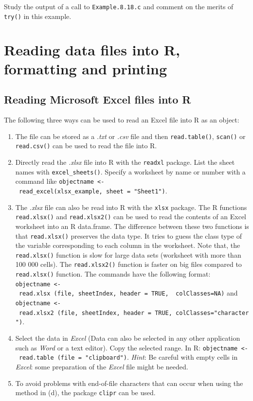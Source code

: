 \documentclass[
]{book}
\begin{document}
Study the output of a call to \texttt{Example.8.18.c} and comment on the merits of \texttt{try()} in this example.

\chapter{Reading data files into R, formatting and printing}\label{data}

\section{Reading Microsoft Excel files into R}\label{reading-microsoft-excel-files-into-r}

The following three ways can be used to read an Excel file into R as an object:

\begin{enumerate}
\def\labelenumi{(\alph{enumi})}
\item
  The file can be stored as a \emph{{.txt}} or \emph{{.csv}} file and then \texttt{read.table()}, \texttt{scan()} or \texttt{read.csv()} can be used to read the file into R.
\item
  Directly read the \emph{{.xlsx}} file into R with the \texttt{readxl} package. List the sheet names with \texttt{excel\_sheets()}. Specify a worksheet by name or number with a command like \texttt{objectname\ \textless{}-\ read\_excel(xlsx\_example,\ sheet\ =\ "Sheet1")}.
\item
  The \emph{{.xlsx}} file can also be read into R with the \texttt{xlsx} package. The R functions \texttt{read.xlsx()} and \texttt{read.xlsx2()} can be used to read the contents of an Excel worksheet into an R data.frame. The difference between these two functions is that \texttt{read.xlsx()} preserves the data type. It tries to guess the class type of the variable corresponding to each column in the worksheet. Note that, the \texttt{read.xlsx()} function is slow for large data sets (worksheet with more than 100 000 cells). The \texttt{read.xlsx2()} function is faster on big files compared to \texttt{read.xlsx()} function. The commands have the following format: \texttt{objectname\ \textless{}-\ read.xlsx\ (file,\ sheetIndex,\ header\ =\ TRUE,\ \ colClasses=NA)} and \texttt{objectname\ \textless{}-\ read.xlsx2\ (file,\ sheetIndex,\ header\ =\ TRUE,\ colClasses="character")}.
\item
  Select the data in \emph{{Excel}} (Data can also be selected in any other application such as \emph{{Word}} or a text editor). Copy the selected range. In R: \texttt{objectname\ \textless{}-\ read.table\ (file\ =\ "clipboard")}. \emph{Hint}: Be careful with empty cells in \emph{{Excel}}: some preparation of the \emph{{Excel}} file might be needed.
\item
  To avoid problems with end-of-file characters that can occur when using the method in (d), the package \texttt{clipr} can be used.
\end{enumerate}
\end{document}
